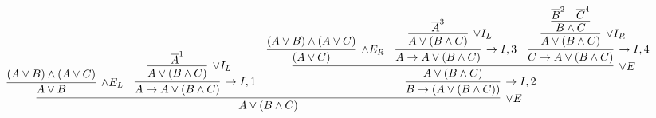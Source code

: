 \documentclass[11pt]{report}
\newcommand{\temp}[2]{{\overline{#2}}^{#1}}
\begin{document}
\begin{enumerate}
\begin{enumerate}
		\newpage
		\begin{figure}
		\begin{center}
			$\begin{array}{c}
				\infer[\lor E]{A \lor (B \land C)}
					{\infer[\land E_{L}]{A \lor B}
						{(A \lor B) \land (A \lor C)}
					&
					\infer[\to I,1]{A \to A \lor (B \land C)}
						{\infer[\lor I_{L}]{A \lor (B \land C)}
							{\temp{1}{A}}}
					&
					\infer[\to I, 2]{B \to (A \lor (B \land C))}
						{\infer[\lor E]{A \lor (B \land C)}
							{\infer[\land E_{R}]{(A \lor C)}
								{(A \lor B) \land (A \lor C)}
							&
							\infer[\to I,3]{A \to A \lor (B \land C)}
								{\infer[\lor I_{L}]{A \lor (B \land C)}
									{\temp{3}{A}}}
							&
							\infer[\to I, 4]{C \to A \lor (B \land C)}
								{\infer[\lor I_{R}]{A \lor (B \land C)}
									{\infer[]{B \land C}
										{\temp{2}{B}&\temp{4}{C}}}}}}}
			\end{array}$
		\end{center}
	\end{figure}





	\end{enumerate}



\end{enumerate}	
\end{document}
